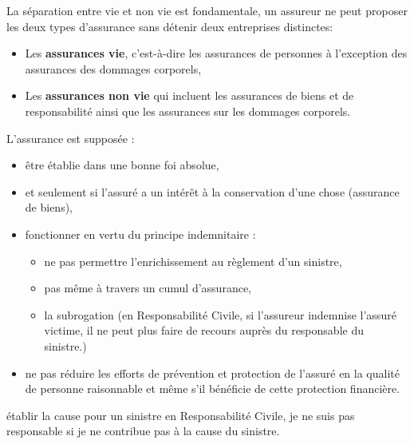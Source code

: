 \begin{f}
	
La séparation entre vie et non vie est fondamentale, un assureur ne peut proposer les deux types d'assurance sans détenir deux entreprises distinctes: 	
\begin{itemize}
	\item Les \textbf{assurances vie}, c'est-à-dire les assurances de personnes à l'exception des assurances des dommages corporels,
	\item Les \textbf{assurances non vie} qui incluent les assurances de biens et de responsabilité ainsi que les assurances sur les dommages corporels. 
\end{itemize}
\end{f}


\begin{f}
	
	
L'assurance est supposée :
	\begin{itemize}
		\item être établie dans une bonne foi absolue,
		\item et seulement si l'assuré a un intérêt à la conservation d'une chose (assurance de biens),
		\item fonctionner en vertu du principe indemnitaire : 
		\begin{itemize}
			\item ne pas permettre l'enrichissement au règlement d'un sinistre,
			\item pas même à travers un cumul d'assurance, 
			\item la subrogation (en Responsabilité Civile, si l'assureur indemnise l'assuré victime, il ne peut plus faire de recours auprès du responsable du sinistre.) 
		\end{itemize}
		\item ne pas réduire les efforts de prévention et protection de l'assuré en la qualité de personne raisonnable et même s'il bénéficie de cette protection financière.
	\end{itemize}
	\item établir la cause pour un sinistre en Responsabilité Civile, je ne suis pas responsable si je ne contribue pas à la cause du sinistre.
\end{f}


